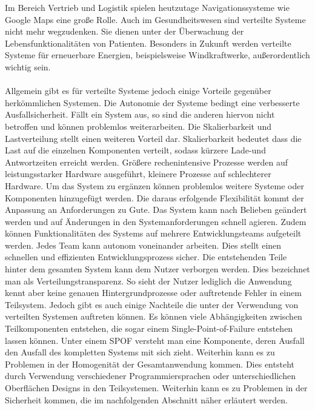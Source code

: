 \documentclass[utf8,biblatex]{lni}
\begin{document}
Im Bereich Vertrieb und Logistik spielen heutzutage Navigationssysteme wie Google Maps eine große Rolle. Auch im Gesundheitswesen sind verteilte Systeme nicht mehr wegzudenken. Sie dienen unter
der Überwachung der Lebensfunktionalitäten von Patienten. Besonders in Zukunft werden verteilte Systeme für erneuerbare Energien, beispielsweise Windkraftwerke, außerordentlich wichtig sein. \citet{o.V.2011}
\\\\
Allgemein gibt es für verteilte Systeme jedoch einige Vorteile gegenüber herkömmlichen Systemen. Die Autonomie der Systeme bedingt eine verbesserte Ausfallsicherheit.
Fällt ein System aus, so sind die anderen hiervon nicht betroffen und können problemlos weiterarbeiten. 
Die Skalierbarkeit und Lastverteilung stellt einen weiteren Vorteil dar. Skalierbarkeit bedeutet dass die Last auf die einzelnen Komponenten verteilt, sodass kürzere Lade-und Antwortzeiten
erreicht werden. Größere rechenintensive Prozesse werden auf leistungsstarker Hardware ausgeführt, kleinere Prozesse auf schlechterer Hardware. Um das System zu ergänzen können problemlos weitere
Systeme oder Komponenten hinzugefügt werden. Die daraus erfolgende Flexibilität kommt der Anpassung an Anforderungen zu Gute. Das System kann nach Belieben geändert werden und auf Änderungen
in den Systemanforderungen schnell agieren. Zudem können Funktionalitäten des Systems auf mehrere Entwicklungsteams aufgeteilt werden. Jedes Team kann autonom voneinander arbeiten. Dies stellt
einen schnellen und effizienten Entwicklungsprozess sicher. Die entstehenden Teile hinter dem gesamten System kann dem Nutzer verborgen werden. Dies bezeichnet man als Verteilungstransparenz. So sieht der Nutzer
lediglich die Anwendung kennt aber keine genauen Hintergrundprozesse oder auftretende Fehler in einem Teilsystem. \citet{Mandl.2009}
\newline
Jedoch gibt es auch einige Nachteile die unter der Verwendung von verteilten Systemen auftreten können. Es können viele Abhängigkeiten zwischen Teilkomponenten entstehen, 
die sogar einem Single-Point-of-Failure entstehen lassen können. Unter einem SPOF versteht man eine Komponente, deren Ausfall den Ausfall des kompletten Systems mit sich zieht. Weiterhin kann
es zu Problemen in der Homogenität der Gesamtanwendung kommen. Dies entsteht durch Verwendung verschiedener Programmiersprachen oder unterschiedlichen Oberflächen Designs in den Teilsystemen. 
Weiterhin kann es zu Problemen in der Sicherheit kommen, die im nachfolgenden Abschnitt näher erläutert werden.
\end{document}
